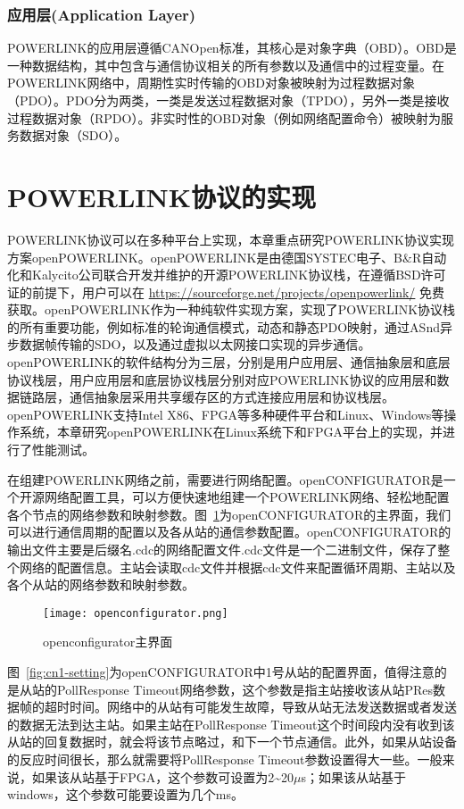 \subsubsection{应用层(Application Layer)}

POWERLINK的应用层遵循CANOpen标准，其核心是对象字典（OBD）\cite{jin2012}。OBD是一种数据结构，其中包含与通信协议相关的所有参数以及通信中的过程变量。在POWERLINK网络中，周期性实时传输的OBD对象被映射为过程数据对象（PDO）。PDO分为两类，一类是发送过程数据对象（TPDO），另外一类是接收过程数据对象（RPDO）。非实时性的OBD对象（例如网络配置命令）被映射为服务数据对象（SDO）。


\section{POWERLINK协议的实现}
\label{POWERLINK协议的实现}
POWERLINK协议可以在多种平台上实现，本章重点研究POWERLINK协议实现方案openPOWERLINK。openPOWERLINK是由德国SYSTEC电子、B$\&$R自动化和Kalycito公司联合开发并维护的开源POWERLINK协议栈，在遵循BSD许可证的前提下，用户可以在 \url{https://sourceforge.net/projects/openpowerlink/} 免费获取。openPOWERLINK作为一种纯软件实现方案，实现了POWERLINK协议栈的所有重要功能，例如标准的轮询通信模式，动态和静态PDO映射，通过ASnd异步数据帧传输的SDO，以及通过虚拟以太网接口实现的异步通信\cite{oplk}。openPOWERLINK的软件结构分为三层，分别是用户应用层、通信抽象层和底层协议栈层，用户应用层和底层协议栈层分别对应POWERLINK协议的应用层和数据链路层，通信抽象层采用共享缓存区的方式连接应用层和协议栈层。openPOWERLINK支持Intel X86、FPGA等多种硬件平台和Linux、Windows等操作系统，本章研究openPOWERLINK在Linux系统下和FPGA平台上的实现，并进行了性能测试。

在组建POWERLINK网络之前，需要进行网络配置。openCONFIGURATOR是一个开源网络配置工具\cite{openCONFIGURATOR}，可以方便快速地组建一个POWERLINK网络、轻松地配置各个节点的网络参数和映射参数。图~\ref{fig:openconfigurator}为openCONFIGURATOR的主界面，我们可以进行通信周期的配置以及各从站的通信参数配置。openCONFIGURATOR的输出文件主要是后缀名.cdc的网络配置文件.cdc文件是一个二进制文件，保存了整个网络的配置信息。主站会读取cdc文件并根据cdc文件来配置循环周期、主站以及各个从站的网络参数和映射参数。

\begin{figure}[!htb]
  \centering
  \texttt{[image: openconfigurator.png]}
  \caption{openconfigurator主界面}
  \label{fig:openconfigurator}
\end{figure}

图~\ref{fig:cn1-setting}为openCONFIGURATOR中1号从站的配置界面，值得注意的是从站的PollResponse Timeout网络参数，这个参数是指主站接收该从站PRes数据帧的超时时间。网络中的从站有可能发生故障，导致从站无法发送数据或者发送的数据无法到达主站。如果主站在PollResponse Timeout这个时间段内没有收到该从站的回复数据时，就会将该节点略过，和下一个节点通信。此外，如果从站设备的反应时间很长，那么就需要将PollResponse Timeout参数设置得大一些。一般来说，如果该从站基于FPGA，这个参数可设置为2\~{}20$\mu$s；如果该从站基于windows，这个参数可能要设置为几个ms。


